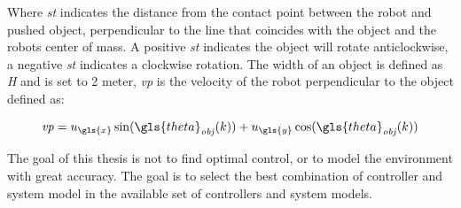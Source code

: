 Where \textit{st} indicates the distance from the contact point between the robot and pushed object, perpendicular to the line that coincides with the object and the robots center of mass. A positive \textit{st} indicates the object will rotate anticlockwise, a negative \textit{st} indicates a clockwise rotation. The width of an object is defined as \textit{H} and is set to 2 meter, \textit{vp} is the velocity of the robot perpendicular to the object defined as:\bs

\[ \mathit{vp} = u_{\gls{x}} \sin(\gls{theta}_{\mathit{obj}}(k)) + u_{\gls{y}}\cos(\gls{theta}_{\mathit{obj}}(k)) \]

The goal of this thesis is not to find optimal control, or to model the environment with great accuracy. The goal is to select the best combination of controller and system model in the available set of controllers and system models.

